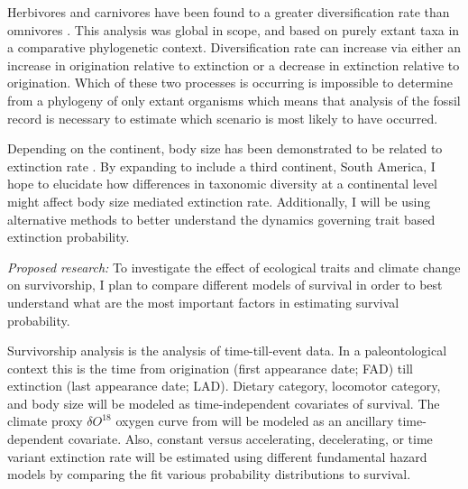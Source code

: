 \documentclass[12pt,letterpaper]{article}
\begin{document}
Herbivores and carnivores have been found to a greater diversification rate than omnivores \citep{Price2012}. This analysis was global in scope, and based on purely extant taxa in a comparative phylogenetic context. Diversification rate can increase via either an increase in origination relative to extinction or a decrease in extinction relative to origination. Which of these two processes is occurring is impossible to determine from a phylogeny of only extant organisms \citep{Rabosky2010a} which means that analysis of the fossil record is necessary to estimate which scenario is most likely to have occurred. 

Depending on the continent, body size has been demonstrated to be related to extinction rate \citep{Tomiya2013,Liow2008,Liow2009}. By expanding to include a third continent, South America, I hope to elucidate how differences in taxonomic diversity at a continental level might affect body size mediated extinction rate. Additionally, I will be using alternative methods to better understand the dynamics governing trait based extinction probability.

\textit{Proposed research:}
To investigate the effect of ecological traits and climate change on survivorship, I plan to compare different models of survival in order to best understand what are the most important factors in estimating survival probability.

Survivorship analysis is the analysis of time-till-event data. In a paleontological context this is the time from origination (first appearance date; FAD) till extinction (last appearance date; LAD). Dietary category, locomotor category, and body size will be modeled as time-independent covariates of survival. The climate proxy \(\delta O^{18}\) oxygen curve from \citet{Zachos2008} will be modeled as an ancillary time-dependent covariate. Also, constant versus accelerating, decelerating, or time variant extinction rate will be estimated using different fundamental hazard models by comparing the fit various probability distributions to survival.

\end{document}
